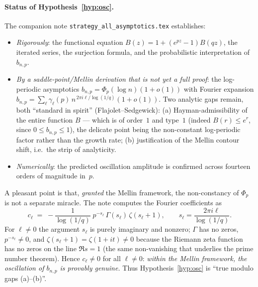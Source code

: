 \documentclass[11pt]{article}
\theoremstyle{definition}
\begin{document}
\paragraph{Status of Hypothesis~\ref{hyp:osc}.} The companion note
\texttt{strategy\_all\_asymptotics.tex} establishes:
\begin{itemize}[leftmargin=1.6em]
\item \emph{Rigorously}: the functional equation
  $B(z)=1+(e^{pz}-1)B(qz)$, the iterated series, the surjection
  formula, and the probabilistic interpretation of $b_{n,p}$.
\item \emph{By a saddle-point/Mellin derivation that is not yet a
  full proof}: the log-periodic asymptotics
  $b_{n,p}=\Phi_p(\log n)(1+o(1))$ with Fourier expansion
  $b_{n,p}=\sum_{\ell}\gamma_\ell(p)\,n^{\,2\pi i\ell/\log(1/q)}(1+o(1))$.
  Two analytic gaps remain, both ``standard in spirit''
  (Flajolet--Sedgewick): (a) Hayman-admissibility of the entire
  function $B$ --- which is of order~$1$ and type~$1$ (indeed
  $B(r)\le e^r$, since $0\le b_{n,p}\le1$), the delicate point being
  the non-constant log-periodic factor rather than the growth rate;
  (b) justification of the Mellin contour shift, i.e.\ the strip of
  analyticity.
\item \emph{Numerically}: the predicted oscillation amplitude is
  confirmed across fourteen orders of magnitude in~$p$.
\end{itemize}
A pleasant point is that, \emph{granted} the Mellin framework, the
non-constancy of $\Phi_p$ is not a separate miracle. The note computes
the Fourier coefficients as
\[
  c_\ell \;=\; -\frac{1}{\log(1/q)}\;p^{-s_\ell}\,
  \Gamma(s_\ell)\,\zeta(s_\ell+1),
  \qquad s_\ell=\frac{2\pi i\ell}{\log(1/q)} .
\]
For $\ell\ne 0$ the argument $s_\ell$ is purely imaginary and nonzero;
$\Gamma$ has no zeros, $p^{-s_\ell}\ne 0$, and
$\zeta(s_\ell+1)=\zeta(1+it)\ne 0$ because the Riemann zeta function
has no zeros on the line $\Re s=1$ (the same non-vanishing that
underlies the prime number theorem). Hence $c_\ell\ne 0$ for all
$\ell\ne 0$: \emph{within the Mellin framework, the oscillation of
$b_{n,p}$ is provably genuine.} Thus Hypothesis~\ref{hyp:osc} is
``true modulo gaps (a)--(b)''.
\end{document}
